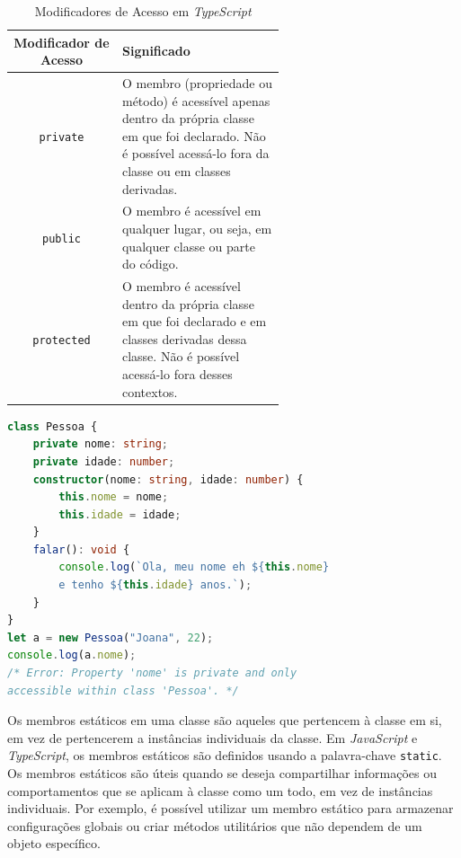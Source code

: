 \begin{table}
\centering
\begin{tabular}{|c|p{0.6\linewidth}|}
\hline
\textbf{Modificador de Acesso} & \textbf{Significado} \\
\hline
\texttt{private} & O membro (propriedade ou método) é acessível apenas dentro da própria classe em que foi declarado. Não é possível acessá-lo fora da classe ou em classes derivadas. \\
\hline
\texttt{public} & O membro é acessível em qualquer lugar, ou seja, em qualquer classe ou parte do código. \\
\hline
\texttt{protected} & O membro é acessível dentro da própria classe em que foi declarado e em classes derivadas dessa classe. Não é possível acessá-lo fora desses contextos. \\
\hline
\end{tabular}
\caption{\label{tab:modif-acess}Modificadores de Acesso em \textit{TypeScript}}
\end{table}


\Needspace{0.3\textheight}
\begin{lstlisting}[language=TypeScript, caption=Propriedades privadas em TS., label=lst:private]
class Pessoa {
    private nome: string;
    private idade: number;
    constructor(nome: string, idade: number) {
        this.nome = nome;
        this.idade = idade;
    }
    falar(): void {
        console.log(`Ola, meu nome eh ${this.nome} 
        e tenho ${this.idade} anos.`);
    }
}
let a = new Pessoa("Joana", 22);
console.log(a.nome);
/* Error: Property 'nome' is private and only 
accessible within class 'Pessoa'. */
\end{lstlisting}
 

Os membros estáticos em uma classe são aqueles que pertencem à classe em si, em vez de pertencerem a instâncias individuais da classe. Em \textit{JavaScript} e \textit{TypeScript}, os membros estáticos são definidos usando a palavra-chave \texttt{static}. Os membros estáticos são úteis quando se deseja compartilhar informações ou comportamentos que se aplicam à classe como um todo, em vez de instâncias individuais. Por exemplo, é possível utilizar um membro estático para armazenar configurações globais ou criar métodos utilitários que não dependem de um objeto específico. 

